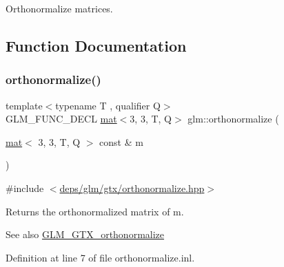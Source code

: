 Orthonormalize matrices. 

\subsection{Function Documentation}
\mbox{\label{group__gtx__orthonormalize_ga4cab5d698e6e2eccea30c8e81c74371f}} 
\subsubsection{\texorpdfstring{orthonormalize()}{orthonormalize()}\hspace{0.1cm}{\footnotesize\ttfamily [1/2]}}
{\footnotesize\ttfamily template$<$typename T , qualifier Q$>$ \\
G\+L\+M\+\_\+\+F\+U\+N\+C\+\_\+\+D\+E\+CL \hyperlink{structglm_1_1mat}{mat}$<$3, 3, T, Q$>$ glm\+::orthonormalize (\begin{DoxyParamCaption}\item[{\hyperlink{structglm_1_1mat}{mat}$<$ 3, 3, T, Q $>$ const \&}]{m }\end{DoxyParamCaption})}



{\ttfamily \#include $<$\hyperlink{orthonormalize_8hpp}{deps/glm/gtx/orthonormalize.\+hpp}$>$}

Returns the orthonormalized matrix of m.

\begin{DoxySeeAlso}{See also}
\hyperlink{group__gtx__orthonormalize}{G\+L\+M\+\_\+\+G\+T\+X\+\_\+orthonormalize} 
\end{DoxySeeAlso}


Definition at line 7 of file orthonormalize.\+inl.

\mbox{\label{group__gtx__orthonormalize_gac3bc7ef498815026bc3d361ae0b7138e}} 
